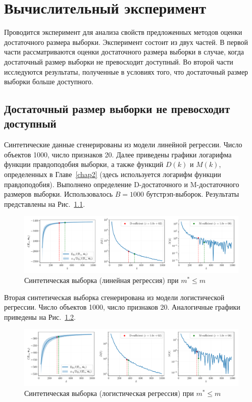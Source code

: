 \chapter{Вычислительный эксперимент}\label{chap4}

Проводится эксперимент для анализа свойств предложенных методов оценки достаточного размера выборки. Эксперимент состоит из двух частей. В первой части рассматриваются оценки достаточного размера выборки в случае, когда достаточный размер выборки не превосходит доступный. Во второй части исследуются результаты, полученные в условиях того, что достаточный размер выборки больше доступного.

\section{Достаточный размер выборки не превосходит доступный}

Синтетические данные сгенерированы из модели линейной регрессии. Число объектов 1000, число признаков 20. Далее приведены графики логарифма функции правдоподобия выборки, а также функций $D(k)$ и $M(k)$, определенных в Главе~\ref{chap2} (здесь используется логарифм функции правдоподобия). Выполнено определение D-достаточного и M-достаточного размеров выборки. Использовалось $B=1000$ бутстрэп-выборок. Результаты представлены на Рис.~\ref{synthetic-regression-sufficient}.

\begin{figure}[h!]
    \centering
    \includegraphics[width=\textwidth]{paper/figures/synthetic-regression-sufficient.pdf}
    \caption{Синтетическая выборка (линейная регрессия) при $m^* \leqslant m$}
    \label{synthetic-regression-sufficient}
\end{figure}

Вторая синтетическая выборка сгенерирована из модели логистической регрессии. Число объектов 1000, число признаков 20. Аналогичные графики приведены на Рис.~\ref{synthetic-classification-sufficient}.

\begin{figure}[h!]
    \centering
    \includegraphics[width=\textwidth]{paper/figures/synthetic-classification-sufficient.pdf}
    \caption{Синтетическая выборка (логистическая регрессия) при $m^* \leqslant m$}
    \label{synthetic-classification-sufficient}
\end{figure}

